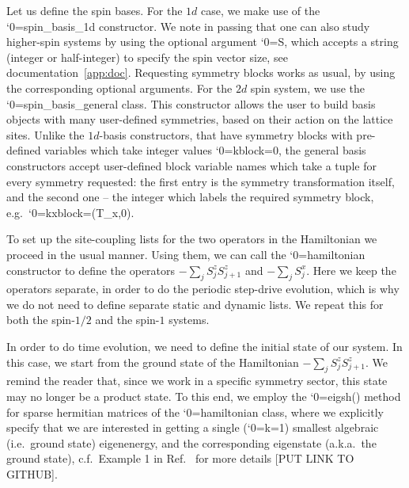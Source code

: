 \documentclass{SciPost}
\newcommand\0{\scalebox{-1}[1]{0}}
\let\svttfamily\ttfamily
\renewcommand\ttfamily{\svttfamily\catcode`0=\active }
\renewcommand\texttt{\bgroup\ttfamily\texttthelp}
\def\texttthelp#1{#1\egroup}
\newcommand{\Spincode}{example9.py}
\begin{document}

Let us define the spin bases. For the $1d$ case, we make use of the \texttt{spin\_basis\_1d} constructor. We note in passing that one can also study higher-spin systems by using the optional argument \texttt{S}, which accepts a string (integer or half-integer) to specify the spin vector size, see documentation~\ref{app:doc}. Requesting symmetry blocks works as usual, by using the corresponding optional arguments. For the $2d$ spin system, we use the \texttt{spin\_basis\_general} class. This constructor allows the user to build basis objects with many user-defined symmetries, based on their action on the lattice sites. Unlike the $1d$-basis constructors, that have symmetry blocks with pre-defined variables which take integer values \texttt{kblock=0}, the general basis constructors accept user-defined block variable names which take a tuple for every symmetry requested: the first entry is the symmetry transformation itself, and the second one -- the integer which labels the required symmetry block, e.g.~\texttt{kxblock=(T\_x,0)}.
 
To set up the site-coupling lists for the two operators in the Hamiltonian we proceed in the usual manner. Using them, we can call the \texttt{hamiltonian} constructor to define the operators $-\sum_j S^z_{j}S^z_{j+1}$ and $-\sum_j S^x_j$. Here we keep the operators separate, in order to do the periodic step-drive evolution, which is why we do not need to define separate static and dynamic lists. We repeat this for both the spin-$1/2$ and the spin-$1$ systems.

In order to do time evolution, we need to define the initial state of our system. In this case, we start from the ground state of the Hamiltonian $-\sum_j S^z_{j}S^z_{j+1}$. We remind the reader that, since we work in a specific symmetry sector, this state may no longer be a product state. To this end, we employ the \texttt{eigsh()} method for sparse hermitian matrices of the \texttt{hamiltonian} class, where we explicitly specify that we are interested in getting a single (\texttt{k=1}) smallest algebraic (i.e.~ground state) eigenenergy, and the corresponding eigenstate (a.k.a.~the ground state), c.f.~Example 1 in Ref.~\cite{weinberg_17_quspin} for more details [PUT LINK TO GITHUB]. 

\end{document}
